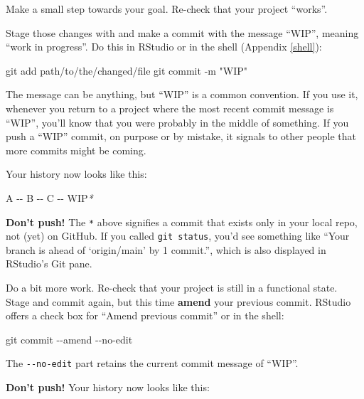 \documentclass[
]{book}
\newenvironment{Shaded}{\begin{snugshade}}{\end{snugshade}}
\newcommand{\AttributeTok}[1]{\textcolor[rgb]{0.13,0.29,0.53}{#1}}
\newcommand{\ExtensionTok}[1]{#1}
\newcommand{\NormalTok}[1]{#1}
\newcommand{\PreprocessorTok}[1]{\textcolor[rgb]{0.56,0.35,0.01}{\textit{#1}}}
\begin{document}
Make a small step towards your goal.
Re-check that your project ``works''.

Stage those changes with and make a commit with the message ``WIP'', meaning ``work in progress''.
Do this in RStudio or in the shell (Appendix \ref{shell}):

\begin{Shaded}
\begin{Highlighting}[]
\NormalTok{git add path/to/the/changed/file}
\NormalTok{git commit {-}m "WIP"}
\end{Highlighting}
\end{Shaded}

The message can be anything, but ``WIP'' is a common convention.
If you use it, whenever you return to a project where the most recent commit message is ``WIP'', you'll know that you were probably in the middle of something.
If you push a ``WIP'' commit, on purpose or by mistake, it signals to other people that more commits might be coming.

Your history now looks like this:

\begin{Shaded}
\begin{Highlighting}[]
\ExtensionTok{A} \AttributeTok{{-}{-}}\NormalTok{ B }\AttributeTok{{-}{-}}\NormalTok{ C }\AttributeTok{{-}{-}}\NormalTok{ WIP}\PreprocessorTok{*}
\end{Highlighting}
\end{Shaded}

\textbf{Don't push!}
The \texttt{*} above signifies a commit that exists only in your local repo, not (yet) on GitHub.
If you called \texttt{git\ status}, you'd see something like ``Your branch is ahead of `origin/main' by 1 commit.'', which is also displayed in RStudio's Git pane.

Do a bit more work.
Re-check that your project is still in a functional state.
Stage and commit again, but this time \textbf{amend} your previous commit.
RStudio offers a check box for ``Amend previous commit'' or in the shell:

\begin{Shaded}
\begin{Highlighting}[]
\NormalTok{git commit {-}{-}amend {-}{-}no{-}edit}
\end{Highlighting}
\end{Shaded}

The \texttt{-\/-no-edit} part retains the current commit message of ``WIP''.

\textbf{Don't push!} Your history now looks like this:
\end{document}
